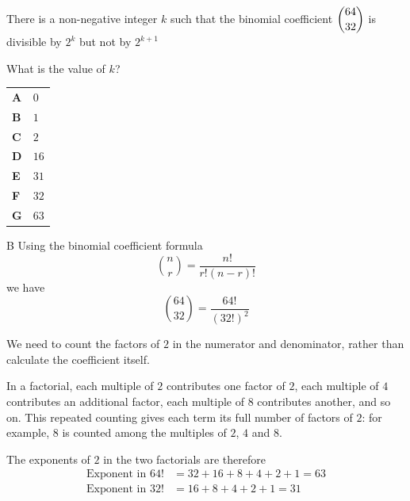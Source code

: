 \documentclass[11pt,a4paper]{article}
\begin{document}
\clearpage
\thispagestyle{djssolutions}
\vspace*{8pt}
\begin{enumerate}[label=\textbf{\arabic*.},leftmargin=*,itemsep=0pt,start=13]
\questionitem[Number]
There is a non-negative integer $k$ such that the binomial coefficient $\dbinom{64}{32}$ is divisible by $2^k$ but not by $2^{k+1}$ 

What is the value of $k$?

\par\vspace*{12pt}
\begin{tabularx}{\linewidth}{@{}>{\bfseries}l Y@{}}
A &
$0$
\\[0.8em]
B &
$1$
\\[0.8em]
C &
$2$
\\[0.8em]
D &
$16$
\\[0.8em]
E &
$31$
\\[0.8em]
F &
$32$
\\[0.8em]
G &
$63$
\\
\end{tabularx}

\begin{djsSolution}{B}
Using the binomial coefficient formula
\[
\binom{n}{r}=\frac{n!}{r!(n-r)!}
\]
we have
\[
\binom{64}{32}=\frac{64!}{(32!)^2}
\]

We need to count the factors of $2$ in the numerator and denominator, rather than calculate the coefficient itself.

In a factorial, each multiple of $2$ contributes one factor of $2$, each multiple of $4$ contributes an additional factor, each multiple of $8$ contributes another, and so on. This repeated counting gives each term its full number of factors of $2$: for example, $8$ is counted among the multiples of $2$, $4$ and $8$.

The exponents of $2$ in the two factorials are therefore
\[
\begin{aligned}
\text{Exponent in }64!&=32+16+8+4+2+1=63\\[5pt]
\text{Exponent in }32!&=16+8+4+2+1=31
\end{aligned}
\]


\end{djsSolution}
\end{enumerate}
\end{document}
